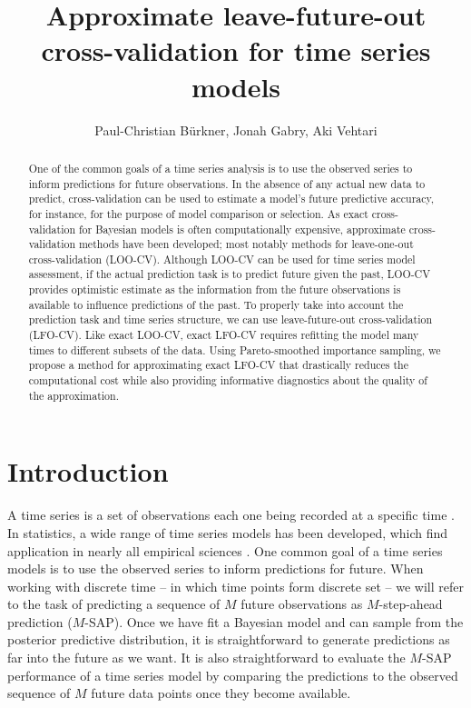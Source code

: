 \documentclass[american,]{article}
\title{Approximate leave-future-out cross-validation for time series models}
\author{Paul-Christian Bürkner, Jonah Gabry, Aki Vehtari}
\date{}
\begin{document}
\maketitle
\begin{abstract}
  One of the common goals of a time series analysis is to use the observed series to inform predictions for future observations. In the absence of any actual new data to predict, cross-validation can be used to estimate a model's future predictive accuracy, for instance, for the purpose of model comparison or selection. As exact cross-validation for Bayesian models is often computationally expensive, approximate cross-validation methods have been developed; most notably methods for leave-one-out cross-validation (LOO-CV).
  Although LOO-CV can be used for time series model assessment, if the actual prediction task is to predict future given the past, LOO-CV provides optimistic estimate as the information from the future observations is available to influence predictions of the past.
  To properly take into account the prediction task and time series structure, we can use leave-future-out cross-validation (LFO-CV). Like exact LOO-CV, exact LFO-CV requires refitting the model many times to different subsets of the data. Using Pareto-smoothed importance sampling, we propose a method for approximating exact LFO-CV that drastically reduces the computational cost while also providing informative diagnostics about the quality of the approximation.
\end{abstract}

\hypertarget{introduction}{%
\section{Introduction}\label{introduction}}

A time series is a set of observations each one being recorded at a specific
time \citep{brockwell2002}. In statistics, a wide range of time series models has
been developed, which find application in nearly all empirical sciences \citep[e.g.,
see][]{brockwell2002, hamilton1994}. One common goal of a time series
models is to use the observed series to inform predictions for future. When working with discrete time -- in which time points form
discrete set -- we will refer to the task of predicting a sequence of \(M\) future
observations as \(M\)-step-ahead prediction (\(M\)-SAP). Once we have
fit a Bayesian model and can sample from the posterior predictive distribution,
it is straightforward to generate predictions as far into the future as we want.
It is also straightforward to evaluate the \(M\)-SAP performance of a time series
model by comparing the predictions to the observed sequence of \(M\) future data
points once they become available.
\end{document}
